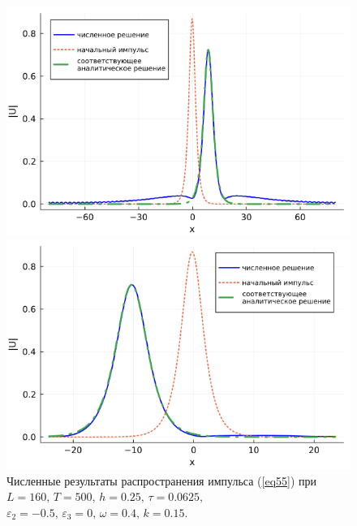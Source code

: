\documentclass[12pt,a4paper]{article}
\begin{document}
	\begin{figure}[H] %
		\begin{center}
			\begin{minipage}[h]{0.48\linewidth}
				\includegraphics[width=1\linewidth]{Medvedev_fig10.png}
			\end{minipage}
			\hfill
			\begin{minipage}[h]{0.48\linewidth}
				\includegraphics[width=1\linewidth]{Medvedev_fig11.png}
			\end{minipage}
		\end{center}
		\caption{Численные результаты распространения импульса (\ref{eq55}) при
		\(L=160,\, T=500,\, h=0.25,\, \tau=0.0625,\)
		\(\varepsilon_{2}=-0.5,\,\varepsilon_{3}=0,\, \omega=0.4,\, k=0.15\).}
		\label{fig21_1}
	\end{figure}
\end{document}
